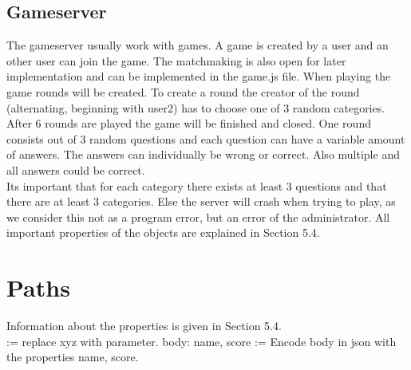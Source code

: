 \subsection{Gameserver}
The gameserver usually work with games. A game is created by a user and an other user can join the game. The matchmaking is also open for later implementation and can be implemented in the game.js file. 
When playing the game rounds will be created. To create a round the creator of the round (alternating, beginning with user2) has to choose one of 3 random categories. After 6 rounds are played the game will be finished and closed. One round consists out of 3 random questions and each question can have a variable amount of answers. The answers can individually be wrong or correct. Also multiple and all answers could be correct.\\
Its important that for each category there exists at least 3 questions and that there are at least 3 categories. Else the server will crash when trying to play, as we consider this not as a program error, but an error of the administrator. All important properties of the objects are explained in Section 5.4.

\newpage
\section {Paths}
Information about the properties is given in Section 5.4.\\
[xyz] := replace xyz with parameter.
body: name, score := Encode body in json with the properties name, score.\\

